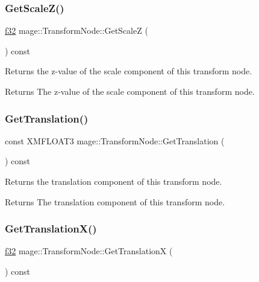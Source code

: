 \subsubsection{\texorpdfstring{Get\+Scale\+Z()}{GetScaleZ()}}
{\footnotesize\ttfamily \hyperlink{namespacemage_a6a44ad388483959dc4dff9f2aef91431}{f32} mage\+::\+Transform\+Node\+::\+Get\+ScaleZ (\begin{DoxyParamCaption}{ }\end{DoxyParamCaption}) const\hspace{0.3cm}{\ttfamily [noexcept]}}

Returns the z-\/value of the scale component of this transform node.

\begin{DoxyReturn}{Returns}
The z-\/value of the scale component of this transform node. 
\end{DoxyReturn}
\hypertarget{structmage_1_1_transform_node_a98da5fb59f03d37a615a9846e5f5e926}{}\label{structmage_1_1_transform_node_a98da5fb59f03d37a615a9846e5f5e926} 
\subsubsection{\texorpdfstring{Get\+Translation()}{GetTranslation()}}
{\footnotesize\ttfamily const X\+M\+F\+L\+O\+A\+T3 mage\+::\+Transform\+Node\+::\+Get\+Translation (\begin{DoxyParamCaption}{ }\end{DoxyParamCaption}) const\hspace{0.3cm}{\ttfamily [noexcept]}}

Returns the translation component of this transform node.

\begin{DoxyReturn}{Returns}
The translation component of this transform node. 
\end{DoxyReturn}
\hypertarget{structmage_1_1_transform_node_a83e22370c12c07387c3383f317025823}{}\label{structmage_1_1_transform_node_a83e22370c12c07387c3383f317025823} 
\subsubsection{\texorpdfstring{Get\+Translation\+X()}{GetTranslationX()}}
{\footnotesize\ttfamily \hyperlink{namespacemage_a6a44ad388483959dc4dff9f2aef91431}{f32} mage\+::\+Transform\+Node\+::\+Get\+TranslationX (\begin{DoxyParamCaption}{ }\end{DoxyParamCaption}) const\hspace{0.3cm}{\ttfamily [noexcept]}}


